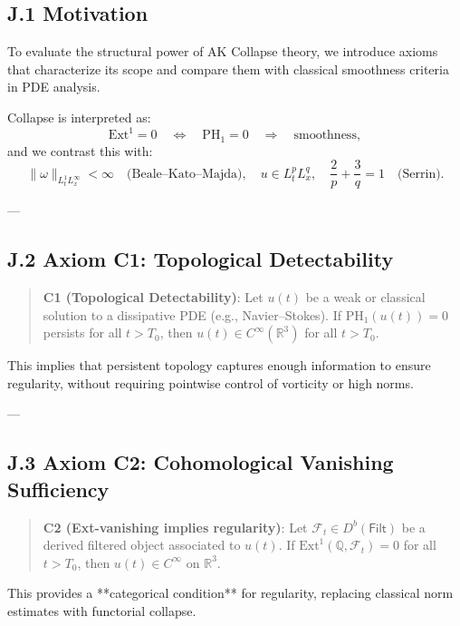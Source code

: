 \documentclass[11pt]{article}
\theoremstyle{definition}
\begin{document}
\subsection*{J.1 Motivation}

To evaluate the structural power of AK Collapse theory, we introduce  
axioms that characterize its scope and compare them with classical smoothness criteria in PDE analysis.

Collapse is interpreted as:
\[
\mathrm{Ext}^1 = 0 \quad \Leftrightarrow \quad \mathrm{PH}_1 = 0 \quad \Rightarrow \quad \text{smoothness},
\]
and we contrast this with:
\[
\|\omega\|_{L^1_t L^\infty_x} < \infty \quad \text{(Beale–Kato–Majda)}, \quad
u \in L^p_t L^q_x, \quad \frac{2}{p} + \frac{3}{q} = 1 \quad \text{(Serrin)}.
\]

---

\subsection*{J.2 Axiom C1: Topological Detectability}

\begin{quote}
\textbf{C1 (Topological Detectability)}:  
Let \( u(t) \) be a weak or classical solution to a dissipative PDE (e.g., Navier–Stokes).  
If \( \mathrm{PH}_1(u(t)) = 0 \) persists for all \( t > T_0 \), then \( u(t) \in C^\infty(\mathbb{R}^3) \) for all \( t > T_0 \).
\end{quote}

This implies that persistent topology captures enough information to ensure regularity,  
without requiring pointwise control of vorticity or high norms.

---

\subsection*{J.3 Axiom C2: Cohomological Vanishing Sufficiency}

\begin{quote}
\textbf{C2 (Ext-vanishing implies regularity)}:  
Let \( \mathcal{F}_t \in D^b(\mathsf{Filt}) \) be a derived filtered object associated to \( u(t) \).  
If \( \mathrm{Ext}^1(\mathbb{Q}, \mathcal{F}_t) = 0 \) for all \( t > T_0 \),  
then \( u(t) \in C^\infty \) on \( \mathbb{R}^3 \).
\end{quote}

This provides a **categorical condition** for regularity, replacing classical norm estimates with functorial collapse.
\end{document}
